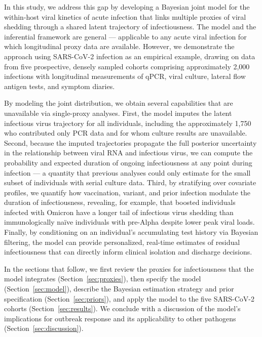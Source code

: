 \documentclass[12pt]{article}
\begin{document}
In this study, we address this gap by developing a Bayesian joint model for the within-host viral kinetics of acute infection that links multiple proxies of viral shedding through a shared latent trajectory of infectiousness. The model and the inferential framework are general --- applicable to any acute viral infection for which longitudinal proxy data are available. However, we demonstrate the approach using SARS-CoV-2 infection as an empirical example, drawing on data from five prospective, densely sampled cohorts comprising approximately 2,000 infections with longitudinal measurements of qPCR, viral culture, lateral flow antigen tests, and symptom diaries.

By modeling the joint distribution, we obtain several capabilities that are unavailable via single-proxy analyses. First, the model imputes the latent infectious virus trajectory for all individuals, including the approximately 1,750 who contributed only PCR data and for whom culture results are unavailable. Second, because the imputed trajectories propagate the full posterior uncertainty in the relationship between viral RNA and infectious virus, we can compute the probability and expected duration of ongoing infectiousness at any point during infection --- a quantity that previous analyses could only estimate for the small subset of individuals with serial culture data. Third, by stratifying over covariate profiles, we quantify how vaccination, variant, and prior infection modulate the duration of infectiousness, revealing, for example, that boosted individuals infected with Omicron have a longer tail of infectious virus shedding than immunologically na\"ive individuals with pre-Alpha despite lower peak viral loads. Finally, by conditioning on an individual's accumulating test history via Bayesian filtering, the model can provide personalized, real-time estimates of residual infectiousness that can directly inform clinical isolation and discharge decisions.

In the sections that follow, we first review the proxies for infectiousness that the model integrates (Section~\ref{sec:proxies}), then specify the model (Section~\ref{sec:model}), describe the Bayesian estimation strategy and prior specification (Section~\ref{sec:priors}), and apply the model to the five SARS-CoV-2 cohorts (Section~\ref{sec:results}). We conclude with a discussion of the model's implications for outbreak response and its applicability to other pathogens (Section~\ref{sec:discussion}).
\end{document}
